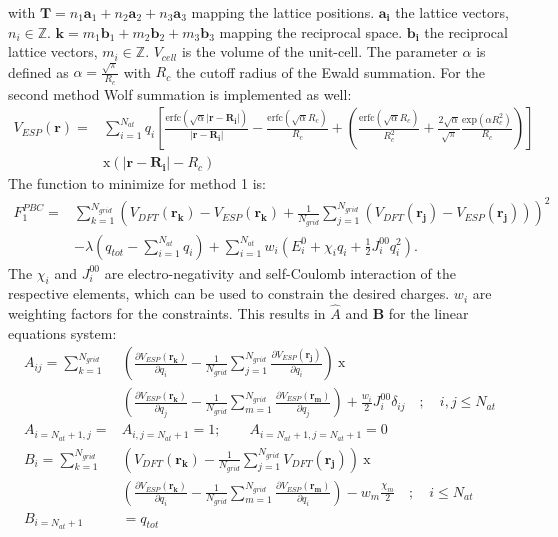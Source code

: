 with $\mathbf{T}=n_1\mathbf{a}_1+n_2\mathbf{a}_2+n_3\mathbf{a}_3$ mapping the lattice positions. $\mathbf{a_i}$ the lattice vectors, 
$n_i \in \mathbb{Z}$. $\mathbf{k}=m_1\mathbf{b}_1+m_2\mathbf{b}_2+m_3\mathbf{b}_3$ mapping the reciprocal space. $\mathbf{b_i}$ the 
reciprocal lattice vectors, $m_i \in \mathbb{Z}$. $V_{cell}$ is the volume of the unit-cell. The parameter $\alpha$ is 
defined as $\alpha=\frac{\sqrt{\pi}}{R_c}$ with $R_c$ the cutoff radius of the 
Ewald summation. For the second method Wolf summation is implemented as well:
\begin{align}
 V_{ESP}(\mathbf{r})=&\sum_{i=1}^{N_{at}}q_i\left[\frac{\mathrm{erfc}(\sqrt{\alpha}|\mathbf{r}-\mathbf{R_{i}}|)}{|\mathbf{r}-\mathbf{R_{i}}|}-\frac{\mathrm{erfc}(\sqrt{\alpha}R_c)}{R_c}+\left(\frac{\mathrm{erfc}(\sqrt{\alpha}R_c)}{R_c^2}+\frac{2\sqrt{\alpha}}{\sqrt{\pi}}\frac{\mathrm{exp}(\alpha R_c^2)}{R_c}\right)\right]\label{V_Wolf}\\
                     &\mathrm{x}(|\mathbf{r}-\mathbf{R_{i}}|-R_c)\nonumber
\end{align}
The function to minimize for method 1 is:
\begin{align}
 F_1^{PBC}=&\sum_{k=1}^{N_{grid}}\left(V_{DFT}(\mathbf{r_k})-V_{ESP}(\mathbf{r_k})+\frac{1}{N_{grid}}\sum_{j=1}^{N_{grid}}\left(V_{DFT}(\mathbf{r_j})-V_{ESP}(\mathbf{r_j})\right)\right)^2\\\nonumber
           &-\lambda\left(q_{tot}-\sum_{i=1}^{N_{at}}q_i\right)+\sum_{i=1}^{N_{at}}w_i\left(E_i^0+\chi_i q_i+\frac{1}{2}J_i^{00}q_i^2\right). \label{F_esp_pbc1}
\end{align}
The $\chi_i$ and $J_i^{00}$ are electro-negativity and self-Coulomb interaction of the respective elements, which can be used to 
constrain the desired charges. $w_i$ are weighting factors for the constraints. This results in $\hat{A}$ and $\mathbf{B}$ for the 
linear equations system:
\begin{align}
 A_{ij}=\sum_{k=1}^{N_{grid}}&\left(\frac{\partial V_{ESP}(\mathbf{r_k})}{\partial q_i}-\frac{1}{N_{grid}}\sum_{j=1}^{N_{grid}}\frac{\partial V_{ESP}(\mathbf{r_j})}{\partial q_i}\right)~\mathrm{x}\\\nonumber
                             & \left(\frac{\partial V_{ESP}(\mathbf{r_k})}{\partial q_j}-\frac{1}{N_{grid}}\sum_{m=1}^{N_{grid}}\frac{\partial V_{ESP}(\mathbf{r_m})}{\partial q_j}\right)+\frac{w_i}{2}J_i^{00}\delta_{ij} \quad\mathrm{;}\quad i,j\leq N_{at}\\\nonumber
A_{i=N_{at}+1,j}=&A_{i,j=N_{at}+1}=1;\qquad A_{i=N_{at}+1,j=N_{at}+1}=0\\\nonumber
 B_{i}=\sum_{k=1}^{N_{grid}}&\left(V_{DFT}(\mathbf{r_k})-\frac{1}{N_{grid}}\sum_{j=1}^{N_{grid}}V_{DFT}(\mathbf{r_j})\right)~\mathrm{x}\\\nonumber
                             & \left(\frac{\partial V_{ESP}(\mathbf{r_k})}{\partial q_i}-\frac{1}{N_{grid}}\sum_{m=1}^{N_{grid}}\frac{\partial V_{ESP}(\mathbf{r_m})}{\partial q_i}\right)-w_m\frac{\chi_m}{2} \quad \mathrm{;} \quad i\leq N_{at}\\\nonumber
B_{i=N_{at}+1}&=q_{tot}\\\nonumber
\end{align}

